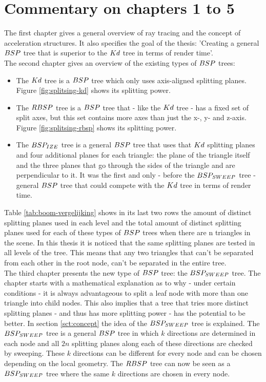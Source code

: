 \newpage

\section{Commentary on chapters 1 to 5}
The first chapter gives a general overview of ray tracing and the concept of acceleration structures.
It also specifies the goal of the thesis: 'Creating a general $BSP$ tree that is superior to the $Kd$ tree in terms of render time'.\\

The second chapter gives an overview of the existing types of $BSP$ trees:
\begin{itemize}
  \item The $Kd$ tree is a $BSP$ tree which only uses axis-aligned splitting planes. Figure \ref{fig:splitsing-kd} shows its splitting power.
  \item The $RBSP$ tree is a $BSP$ tree that - like the $Kd$ tree - has a fixed set of split axes, but this set contains more axes than just the x-, y- and z-axis. Figure \ref{fig:splitsing-rbsp} shows its splitting power.
  \item The $BSP_{IZE}$ tree is a general $BSP$ tree that uses that $Kd$ splitting planes and four additional planes for each triangle: the plane of the triangle itself and the three planes that go through the sides of the triangle and are perpendicular to it. 
  It was the first and only - before the $BSP_{SWEEP}$ tree - general $BSP$ tree that could compete with the $Kd$ tree in terms of render time.
\end{itemize}

Table \ref{tab:boom-vergelijking} shows in its last two rows the amount of distinct splitting planes used in each level and the total amount of distinct splitting planes used for each of these types of $BSP$ trees when there are n triangles in the scene.
In this thesis it is noticed that the same splitting planes are tested in all levels of the tree.
This means that any two triangles that can't be separated from each other in the root node, can't be separated in the entire tree.\\

The third chapter presents the new type of $BSP$ tree: the $BSP_{SWEEP}$ tree.
The chapter starts with a mathematical explanation as to why - under certain conditions - it is always advantageous to split a leaf node with more than one triangle into child nodes.
This also implies that a tree that tries more distinct splitting planes - and thus has more splitting power - has the potential to be better.
In section \ref{sct:concept} the idea of the $BSP_{SWEEP}$ tree is explained.
The $BSP_{SWEEP}$ tree is a general $BSP$ tree in which $k$ directions are determined in each node and all $2n$ splitting planes along each of these directions are checked by sweeping. 
These $k$ directions can be different for every node and can be chosen depending on the local geometry.
The $RBSP$ tree can now be seen as a $BSP_{SWEEP}$ tree where the same $k$ directions are chosen in every node.\\

